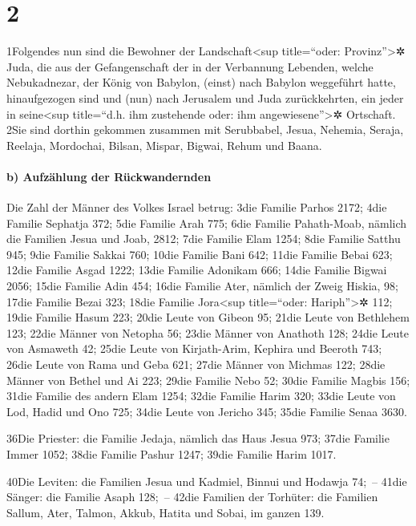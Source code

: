 \hypertarget{section-1}{%
\section{2}\label{section-1}}

1Folgendes nun sind die Bewohner der Landschaft\textless sup
title=``oder: Provinz''\textgreater✲ Juda, die aus der Gefangenschaft
der in der Verbannung Lebenden, welche Nebukadnezar, der König von
Babylon, (einst) nach Babylon weggeführt hatte, hinaufgezogen sind und
(nun) nach Jerusalem und Juda zurückkehrten, ein jeder in
seine\textless sup title=``d.h. ihm zustehende oder: ihm
angewiesene''\textgreater✲ Ortschaft. 2Sie sind dorthin gekommen
zusammen mit Serubbabel, Jesua, Nehemia, Seraja, Reelaja, Mordochai,
Bilsan, Mispar, Bigwai, Rehum und Baana.

\hypertarget{b-aufzuxe4hlung-der-ruxfcckwandernden}{%
\paragraph{b) Aufzählung der
Rückwandernden}\label{b-aufzuxe4hlung-der-ruxfcckwandernden}}

Die Zahl der Männer des Volkes Israel betrug: 3die Familie Parhos 2172;
4die Familie Sephatja 372; 5die Familie Arah 775; 6die Familie
Pahath-Moab, nämlich die Familien Jesua und Joab, 2812; 7die Familie
Elam 1254; 8die Familie Satthu 945; 9die Familie Sakkai 760; 10die
Familie Bani 642; 11die Familie Bebai 623; 12die Familie Asgad 1222;
13die Familie Adonikam 666; 14die Familie Bigwai 2056; 15die Familie
Adin 454; 16die Familie Ater, nämlich der Zweig Hiskia, 98; 17die
Familie Bezai 323; 18die Familie Jora\textless sup title=``oder:
Hariph''\textgreater✲ 112; 19die Familie Hasum 223; 20die Leute von
Gibeon 95; 21die Leute von Bethlehem 123; 22die Männer von Netopha 56;
23die Männer von Anathoth 128; 24die Leute von Asmaweth 42; 25die Leute
von Kirjath-Arim, Kephira und Beeroth 743; 26die Leute von Rama und Geba
621; 27die Männer von Michmas 122; 28die Männer von Bethel und Ai 223;
29die Familie Nebo 52; 30die Familie Magbis 156; 31die Familie des
andern Elam 1254; 32die Familie Harim 320; 33die Leute von Lod, Hadid
und Ono 725; 34die Leute von Jericho 345; 35die Familie Senaa 3630.

36Die Priester: die Familie Jedaja, nämlich das Haus Jesua 973; 37die
Familie Immer 1052; 38die Familie Pashur 1247; 39die Familie Harim 1017.

40Die Leviten: die Familien Jesua und Kadmiel, Binnui und Hodawja 74;~--
41die Sänger: die Familie Asaph 128;~-- 42die Familien der Torhüter: die
Familien Sallum, Ater, Talmon, Akkub, Hatita und Sobai, im ganzen 139.

